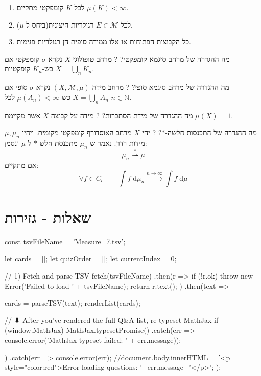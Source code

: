 \documentclass{tstextbook}
\begin{document}
\begin{enumerate}
  \item לכל \(K\) קומפקטי מתקיים \(\mu(K)<\infty\). 


  \item לכל \(E \in \mathcal{M}\) רגולריות חיצונית(ביחס ל-\(\mu\)). 


  \item כל הקבוצות הפתוחות או אלו ממידה סופית הן רגולריות פנימית. 


\end{enumerate}
מה ההגדרה של מרחב סיגמא קומפקטי?
?
מרחב טופולוגי \(X\) נקרא \(\sigma\)-קומפקטי אם \(X=\bigcup_{n}K_{n}\) כש-\(K_{n}\) קופקטיות.

מה ההגדרה של מרחב סיגמא סופי?
?
מרחב מידה \(\left( X,\mathcal{M},\mu \right)\) נקרא \(\sigma\)-סופי אם \(X=\bigcup_{n}A_{n}\) כש-\(\mu(A_{n})<\infty\) לכל \(n \in \mathbb{N}\).

מה ההגדרה של מידת הסתברות?
?
מידה על קבוצה \(X\) אשר מקיימת \(\mu(X)=1\).

מה ההגדרה של התכנסות חלשה-\(*\)?
?
יהי \(X\) מרחב האוסדורף קומפקטי מקומית. ויהיו \(\mu,\mu_{n}\) מידות רדון. נאמר ש-\(\mu_{n}\) מתכנסת חלש-\(*\) ל-\(\mu\) ונסמן:
$$\mu_{n}\overset{*}{\rightharpoonup} \mu$$
אם מתקיים:
$$\forall f \in C_{c}\qquad  \int f \;\mathrm{d} \mu_{n}\xrightarrow{n\to \infty} \int f \;\mathrm{d} \mu  $$

\section{שאלות - גזירות}


    const tsvFileName = 'Measure_7.tsv';

    let cards = [];
    let quizOrder = [];
    let currentIndex = 0;

    // 1) Fetch and parse TSV
fetch(tsvFileName)
  .then(r => {
    if (!r.ok) throw new Error('Failed to load ' + tsvFileName);
    return r.text();
  })
  .then(text => {
    cards = parseTSV(text);
    renderList(cards);

    // ⬇ After you’ve rendered the full Q&A list, re-typeset MathJax
    if (window.MathJax) {
      MathJax.typesetPromise()
        .catch(err => console.error('MathJax typeset failed: ' + err.message));
    }
  })
  .catch(err => {
    console.error(err);
    //document.body.innerHTML =  '<p style="color:red">Error loading questions: '+err.message+'</p>';
  });
\end{document}
